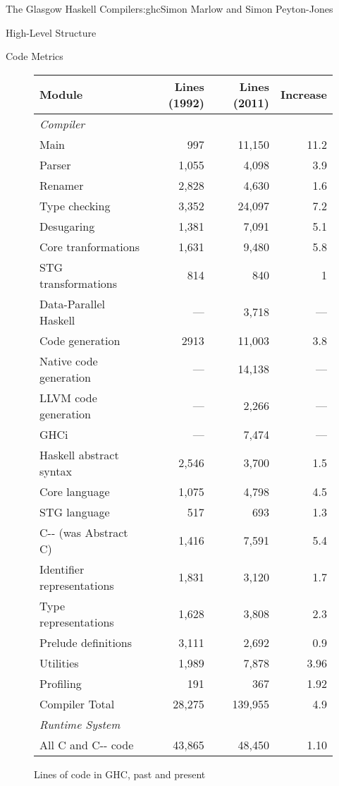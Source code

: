 \begin{aosachapter}{The Glasgow Haskell Compiler}{s:ghc}{Simon Marlow and Simon Peyton-Jones}
\begin{aosasect1}{High-Level Structure}
\begin{aosasect2}{Code Metrics}
\begin{aosaitemize}
\end{aosaitemize}

\begin{figure}
\begin{tabular}{|lrrr|}
\hline
Module & Lines (1992) & Lines (2011) & Increase \\
\hline
\multicolumn{4}{|l|}{\emph{Compiler}} \\
Main    & 997 & 11,150 & 11.2 \\
Parser  & 1,055 & 4,098 & 3.9 \\
Renamer & 2,828 & 4,630 & 1.6 \\
Type checking & 3,352 & 24,097 & 7.2 \\
Desugaring & 1,381 & 7,091 & 5.1 \\
Core tranformations & 1,631 & 9,480 & 5.8 \\
STG transformations & 814 & 840 & 1 \\
Data-Parallel Haskell & --- & 3,718 & --- \\
Code generation & 2913 & 11,003 & 3.8 \\
Native code generation & --- & 14,138 & --- \\
LLVM code generation & --- & 2,266 & --- \\
GHCi & --- & 7,474 & --- \\
Haskell abstract syntax & 2,546 & 3,700 & 1.5 \\
Core language & 1,075 & 4,798 & 4.5 \\
STG language & 517 & 693 & 1.3 \\
C{-}{-} (was Abstract C)  & 1,416 & 7,591 & 5.4 \\
Identifier representations & 1,831 & 3,120 & 1.7 \\
Type representations & 1,628 & 3,808 & 2.3 \\
Prelude definitions & 3,111 & 2,692 & 0.9 \\
Utilities & 1,989 & 7,878 & 3.96 \\
Profiling & 191 & 367 & 1.92 \\
\hline
Compiler Total  & 28,275 & 139,955 & 4.9 \\ \hline
\hline
\multicolumn{4}{|l|}{\emph{Runtime System}} \\
All C and C{-}{-} code & 43,865 & 48,450 & 1.10 \\
\hline
\end{tabular}
\caption{Lines of code in GHC, past and present}
\label{fig.ghc.lines}
\end{figure}


\end{aosasect2}
\end{aosasect1}
\end{aosachapter}
